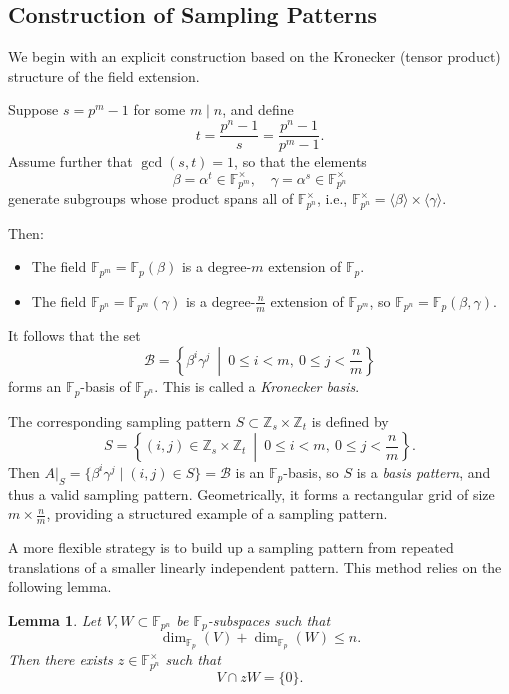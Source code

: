 \documentclass{article}
\newtheorem{lemma}{Lemma}[section]
\begin{document}
\subsection{Construction of Sampling Patterns}

We begin with an explicit construction based on the Kronecker (tensor product) structure of the field extension.

Suppose \( s = p^m - 1 \) for some \( m \mid n \), and define
\[
t = \frac{p^n - 1}{s} = \frac{p^n - 1}{p^m - 1}.
\]
Assume further that \( \gcd(s, t) = 1 \), so that the elements
\[
\beta = \alpha^t \in \mathbb{F}_{p^m}^\times, \quad \gamma = \alpha^s \in \mathbb{F}_{p^n}^\times
\]
generate subgroups whose product spans all of \( \mathbb{F}_{p^n}^\times \), i.e., \( \mathbb{F}_{p^n}^\times = \langle \beta \rangle \times \langle \gamma \rangle \).

Then:
\begin{itemize}
    \item The field \( \mathbb{F}_{p^m} = \mathbb{F}_p(\beta) \) is a degree-\( m \) extension of \( \mathbb{F}_p \).
    \item The field \( \mathbb{F}_{p^n} = \mathbb{F}_{p^m}(\gamma) \) is a degree-\( \frac{n}{m} \) extension of \( \mathbb{F}_{p^m} \), so \( \mathbb{F}_{p^n} = \mathbb{F}_p(\beta, \gamma) \).
\end{itemize}

It follows that the set
\[
\mathcal{B} = \left\{ \beta^i \gamma^j \ \middle|\ 0 \le i < m,\ 0 \le j < \frac{n}{m} \right\}
\]
forms an \(\mathbb{F}_p\)-basis of \( \mathbb{F}_{p^n} \). This is called a \emph{Kronecker basis}.

The corresponding sampling pattern \( S \subset \mathbb{Z}_s \times \mathbb{Z}_t \) is defined by
\[
S = \left\{ (i,j) \in \mathbb{Z}_s \times \mathbb{Z}_t \ \middle|\ 0 \le i < m,\ 0 \le j < \frac{n}{m} \right\}.
\]
Then \( A|_S = \{ \beta^i \gamma^j \mid (i,j) \in S \} = \mathcal{B} \) is an \(\mathbb{F}_p\)-basis, so \( S \) is a \emph{basis pattern}, and thus a valid sampling pattern. Geometrically, it forms a rectangular grid of size \( m \times \frac{n}{m} \), providing a structured example of a sampling pattern.

A more flexible strategy is to build up a sampling pattern from repeated translations of a smaller linearly independent pattern. This method relies on the following lemma.

\begin{lemma}
Let \( V, W \subset \mathbb{F}_{p^n} \) be \(\mathbb{F}_p\)-subspaces such that
\[
\dim_{\mathbb{F}_p}(V) + \dim_{\mathbb{F}_p}(W) \leq n.
\]
Then there exists \( z \in \mathbb{F}_{p^n}^\times \) such that
\[
V \cap zW = \{0\}.
\]
\end{lemma}
\end{document}
